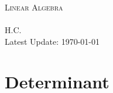 \documentclass{report}
\theoremstyle{nonumberplain}
\begin{document}
~\\
\begin{center}
	~\\
	\vspace{6em}
	\textsc{\Huge Linear Algebra}
	~\\
	\vspace{2.5em}
	{\Large }
	~\\
	\vspace{6em}
	\textsf{H.C.}
	~\\
	\vspace{5in}
	{\large Latest Update: \today}
\end{center}
\tableofcontents
\chapter{Determinant}
\end{document}
